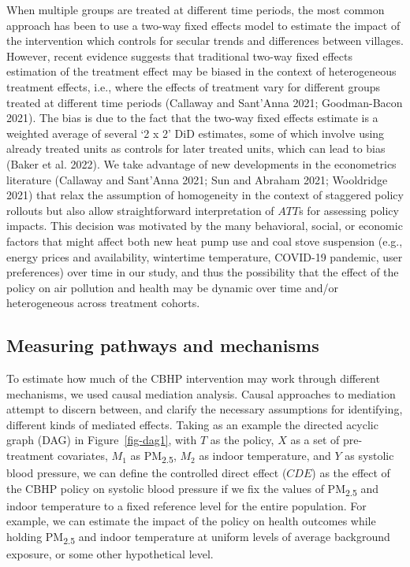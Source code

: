 \documentclass[
  letterpaper,
  DIV=11,
  numbers=noendperiod]{scrartcl}
\begin{document}
When multiple groups are treated at different time periods, the most
common approach has been to use a two-way fixed effects model to
estimate the impact of the intervention which controls for secular
trends and differences between villages. However, recent evidence
suggests that traditional two-way fixed effects estimation of the
treatment effect may be biased in the context of heterogeneous treatment
effects, i.e., where the effects of treatment vary for different groups
treated at different time periods (Callaway and Sant'Anna 2021;
Goodman-Bacon 2021). The bias is due to the fact that the two-way fixed
effects estimate is a weighted average of several `2 x 2' DiD estimates,
some of which involve using already treated units as controls for later
treated units, which can lead to bias (Baker et al. 2022). We take
advantage of new developments in the econometrics literature (Callaway
and Sant'Anna 2021; Sun and Abraham 2021; Wooldridge 2021) that relax
the assumption of homogeneity in the context of staggered policy
rollouts but also allow straightforward interpretation of \(ATT\)s for
assessing policy impacts. This decision was motivated by the many
behavioral, social, or economic factors that might affect both new heat
pump use and coal stove suspension (e.g., energy prices and
availability, wintertime temperature, COVID-19 pandemic, user
preferences) over time in our study, and thus the possibility that the
effect of the policy on air pollution and health may be dynamic over
time and/or heterogeneous across treatment cohorts.

\hypertarget{measuring-pathways-and-mechanisms}{%
\subsection{Measuring pathways and
mechanisms}\label{measuring-pathways-and-mechanisms}}

To estimate how much of the CBHP intervention may work through different
mechanisms, we used causal mediation analysis. Causal approaches to
mediation attempt to discern between, and clarify the necessary
assumptions for identifying, different kinds of mediated effects. Taking
as an example the directed acyclic graph (DAG) in Figure~\ref{fig-dag1},
with \(T\) as the policy, \(X\) as a set of pre-treatment covariates,
\(M_{1}\) as PM\textsubscript{2.5}, \(M_{2}\) as indoor temperature, and
\(Y\) as systolic blood pressure, we can define the controlled direct
effect (\(CDE\)) as the effect of the CBHP policy on systolic blood
pressure if we fix the values of PM\textsubscript{2.5} and indoor
temperature to a fixed reference level for the entire population. For
example, we can estimate the impact of the policy on health outcomes
while holding PM\textsubscript{2.5} and indoor temperature at uniform
levels of average background exposure, or some other hypothetical level.
\end{document}
